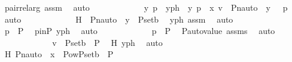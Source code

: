 \begin{isabellebody}
\ pair{\isacharunderscore}{\kern0pt}rel{\isacharunderscore}{\kern0pt}arg\ assm{}\ \isamarkupfalse%
\ auto\ \isanewline
\ \ \ \ \ \ \ \ \isamarkupfalse%
\ \isamarkupfalse%
\ y\ p\ \ yph\ {\isacharcolon}{\kern0pt}\ {\isachardoublequoteopen}{\isacharless}{\kern0pt}y{\isacharcomma}{\kern0pt}\ p{\isachargreater}{\kern0pt}\ {\isasymin}\ x{\isachardoublequoteclose}\ {\isachardoublequoteopen}v\ {\isacharequal}{\kern0pt}\ {\isasymlangle}Pn{\isacharunderscore}{\kern0pt}auto{\isacharparenleft}{\kern0pt}{\isasympi}{\isacharparenright}{\kern0pt}\ {\isacharbackquote}{\kern0pt}\ y{\isacharcomma}{\kern0pt}\ {\isasympi}\ {\isacharbackquote}{\kern0pt}\ p{\isasymrangle}{\isachardoublequoteclose}\ \isamarkupfalse%
\ auto\ \isanewline
\ \ \ \ \ \ \ \ \isamarkupfalse%
\ \isamarkupfalse%
\ H\ {\isacharcolon}{\kern0pt}\ {\isachardoublequoteopen}Pn{\isacharunderscore}{\kern0pt}auto{\isacharparenleft}{\kern0pt}{\isasympi}{\isacharparenright}{\kern0pt}\ {\isacharbackquote}{\kern0pt}\ y\ {\isasymin}\ P{\isacharunderscore}{\kern0pt}set{\isacharparenleft}{\kern0pt}b{\isacharparenright}{\kern0pt}{\isachardoublequoteclose}\ \isamarkupfalse%
\ yph\ assm\ \isamarkupfalse%
\ auto\ \isanewline
\ \ \ \ \ \ \ \ \isamarkupfalse%
\ {\isachardoublequoteopen}p\ {\isasymin}\ P{\isachardoublequoteclose}\ \isamarkupfalse%
\ pinP\ yph\ \isamarkupfalse%
\ auto\ \isanewline
\ \ \ \ \ \ \ \ \isamarkupfalse%
\ \isamarkupfalse%
\ {\isachardoublequoteopen}{\isasympi}{\isacharbackquote}{\kern0pt}p\ {\isasymin}\ P{\isachardoublequoteclose}\ \isamarkupfalse%
\ P{\isacharunderscore}{\kern0pt}auto{\isacharunderscore}{\kern0pt}value\ assms\ \isamarkupfalse%
\ auto\ \isanewline
\ \ \ \ \ \ \ \ \isamarkupfalse%
\ \isamarkupfalse%
\ \ {\isachardoublequoteopen}v\ {\isasymin}\ P{\isacharunderscore}{\kern0pt}set{\isacharparenleft}{\kern0pt}b{\isacharparenright}{\kern0pt}\ {\isasymtimes}\ P{\isachardoublequoteclose}\ \isamarkupfalse%
\ H\ yph\ \isamarkupfalse%
\ auto\ \isanewline
\ \ \ \ \ \ \isamarkupfalse%
\ \ \ \ \ \isanewline
\ \ \ \ \ \ \isamarkupfalse%
\ \isamarkupfalse%
\ H{\isacharcolon}{\kern0pt}\ {\isachardoublequoteopen}Pn{\isacharunderscore}{\kern0pt}auto{\isacharparenleft}{\kern0pt}{\isasympi}{\isacharparenright}{\kern0pt}\ {\isacharbackquote}{\kern0pt}\ x\ {\isasymin}\ Pow{\isacharparenleft}{\kern0pt}P{\isacharunderscore}{\kern0pt}set{\isacharparenleft}{\kern0pt}b{\isacharparenright}{\kern0pt}\ {\isasymtimes}\ P{\isacharparenright}{\kern0pt}{\isachardoublequoteclose}\ \isamarkupfalse%

\end{isabellebody}
